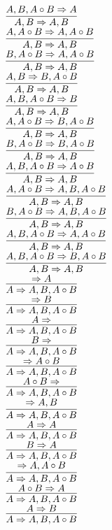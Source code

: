 \documentclass[11pt]{article}
\begin{document}
\begin{center}
\bigskip
\\$\infer{A, B\Rightarrow A, B}{A, B, A\circ B\Rightarrow A}$
\bigskip
\\$\infer{A, B\Rightarrow A, B}{A, A\circ B\Rightarrow A, A\circ B}$
\bigskip
\\$\infer{A, B\Rightarrow A, B}{B, A\circ B\Rightarrow A, A\circ B}$
\bigskip
\\$\infer{A, B\Rightarrow A, B}{A, B\Rightarrow B, A\circ B}$
\bigskip
\\$\infer{A, B\Rightarrow A, B}{A, B, A\circ B\Rightarrow B}$
\bigskip
\\$\infer{A, B\Rightarrow A, B}{A, A\circ B\Rightarrow B, A\circ B}$
\bigskip
\\$\infer{A, B\Rightarrow A, B}{B, A\circ B\Rightarrow B, A\circ B}$
\bigskip
\\$\infer{A, B\Rightarrow A, B}{A, B, A\circ B\Rightarrow A\circ B}$
\bigskip
\\$\infer{A, B\Rightarrow A, B}{A, A\circ B\Rightarrow A, B, A\circ B}$
\bigskip
\\$\infer{A, B\Rightarrow A, B}{B, A\circ B\Rightarrow A, B, A\circ B}$
\bigskip
\\$\infer{A, B\Rightarrow A, B}{A, B, A\circ B\Rightarrow A, A\circ B}$
\bigskip
\\$\infer{A, B\Rightarrow A, B}{A, B, A\circ B\Rightarrow B, A\circ B}$
\bigskip
\\$\infer{A\Rightarrow A, B, A\circ B}{\Rightarrow A}$
\bigskip
\\$\infer{A\Rightarrow A, B, A\circ B}{\Rightarrow B}$
\bigskip
\\$\infer{A\Rightarrow A, B, A\circ B}{A\Rightarrow }$
\bigskip
\\$\infer{A\Rightarrow A, B, A\circ B}{B\Rightarrow }$
\bigskip
\\$\infer{A\Rightarrow A, B, A\circ B}{\Rightarrow A\circ B}$
\bigskip
\\$\infer{A\Rightarrow A, B, A\circ B}{A\circ B\Rightarrow }$
\bigskip
\\$\infer{A\Rightarrow A, B, A\circ B}{\Rightarrow A, B}$
\bigskip
\\$\infer{A\Rightarrow A, B, A\circ B}{A\Rightarrow A}$
\bigskip
\\$\infer{A\Rightarrow A, B, A\circ B}{B\Rightarrow A}$
\bigskip
\\$\infer{A\Rightarrow A, B, A\circ B}{\Rightarrow A, A\circ B}$
\bigskip
\\$\infer{A\Rightarrow A, B, A\circ B}{A\circ B\Rightarrow A}$
\bigskip
\\$\infer{A\Rightarrow A, B, A\circ B}{A\Rightarrow B}$

\end{center}
\end{document}
